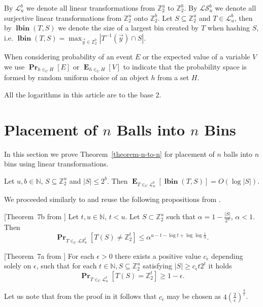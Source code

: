 \documentclass[unicode,review]{siamart1116}
\newcommand{\lbin}[2]{\operatorname{\mathbf{lbin}}({#1}, {#2})}
\newcommand{\vecspace}[2]{\mathbb{Z}_{#1}^{#2}}
\newcommand{\binvecspace}[1]{\vecspace{2}{#1}}
\newcommand{\linearmaps}[2]{\mathcal{L}_{#1}^{#2}}
\newcommand{\surjectivelinearmaps}[2]{\mathcal{LS}_{#1}^{#2}}
\newcommand{\probs}[2]{\operatorname{\mathbf{Pr}}_{{#1}}\left[{#2}\right]}
\newcommand{\expects}[2]{\operatorname{\mathbf{E}}_{{#1}}\left[{#2}\right]}
\numberwithin{theorem}{section}
\begin{document}
By $\linearmaps{u}{b}$ we denote all linear transformations from $\binvecspace{u}$ to $\binvecspace{b}$.
By $\surjectivelinearmaps{u}{b}$ we denote all surjective linear transformations from $\binvecspace{u}$ onto $\binvecspace{b}$.
Let $S \subseteq \binvecspace{u}$ and $T \in \linearmaps{u}{b}$, then by $\lbin{T}{S}$ we denote the size of a largest bin created by $T$ when hashing $S$, i.e. $\lbin{T}{S} = \operatorname{max}_{\vec y \in \binvecspace{b}} |T^{-1}(\vec y) \cap S|$.

When considering probability of an event $E$ or the expected value of a variable $V$ we use $\probs{h \in_U H}{E}$ or $\expects{h \in_U H}{V}$ to indicate that the probability space is formed by random uniform choice of an object $h$ from a set $H$.

All the logarithms in this article are to the base 2.

\section{Placement of \texorpdfstring{$n$}{n} Balls into \texorpdfstring{$n$}{n} Bins}

In this section we prove Theorem~\ref{theorem-n-to-n} for placement of $n$ balls into $n$ bins using linear transformations.
\begin{theorem}
\label{theorem-n-to-n}
Let $u, b \in \mathbb{N}$, $S \subseteq \binvecspace{u}$ and $|S| \leq 2^b$. Then $\expects{T \in_U \linearmaps{u}{b}}{\lbin{T}{S}} = O(\log |S|)$.
\end{theorem}

We proceeded similarly to \cite{alonetal} and reuse the following propositions from \cite{alonetal}.
\begin{proposition}
\label{proposition-prob-bound}[Theorem~{7b} from \cite{alonetal}]
Let $t, u \in \mathbb{N}$, $t < u$.
Let $S \subset \binvecspace{u}$ such that $\alpha = 1 - \frac{|S|}{2^u}$, $\alpha < 1$.
Then 
\[
\probs{T \in_U \surjectivelinearmaps{u}{t}}{T(S) \neq \binvecspace{t}} \leq \alpha^{u - t - \log t + \log \log \frac{1}{\alpha}}.
\]
\end{proposition}

\begin{proposition}
\label{proposition-epsilon}[Theorem~{7a} from \cite{alonetal}]
For each $\epsilon > 0$ there exists a positive value $c_\epsilon$ depending solely on $\epsilon$, such that for each $t \in \mathbb{N}, S \subseteq \binvecspace{u}$ satisfying $|S| \geq c_\epsilon t 2^t$ it holds  \[\probs{T \in_U \linearmaps{u}{t}}{T(S) = \binvecspace{t}} \geq 1 - \epsilon .\]
\end{proposition}
Let us note that from the proof in \cite{alonetal} it follows that $c_\epsilon$ may be chosen as $4\left(\frac{2}{\epsilon}\right)^{\frac{8}{\epsilon}}$.
\end{document}
